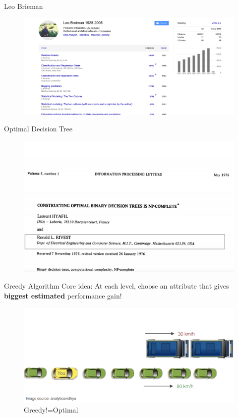 \documentclass[usenames,dvipsnames]{beamer}
\begin{document}
\begin{frame}{Leo Brieman}
\begin{figure}
	\centering
	\includegraphics[width=1\linewidth]{../diagrams/decision-trees/brieman}

	\label{fig:brieman}
\end{figure}

\end{frame}

\begin{frame}{Optimal Decision Tree}
\begin{figure}
	\centering
	\includegraphics[width=1\linewidth]{../diagrams/decision-trees/NP-hard}

	\label{fig:np-hard}
\end{figure}

\end{frame}

\begin{frame}{Greedy Algorithm}
Core idea: At each level, choose an attribute that gives
\textbf{biggest estimated} performance gain!

\begin{figure}
	\centering
	\includegraphics[width=0.8\linewidth]{../diagrams/decision-trees/gredy}
	\caption{Greedy!=Optimal}
	\label{fig:gredy}
\end{figure}

\end{frame}
\end{document}
